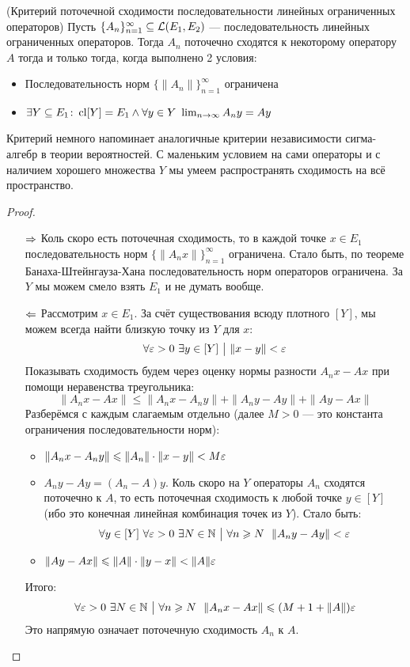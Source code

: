\begin{theorem} (Критерий поточечной сходимости последовательности линейных ограниченных операторов)
	Пусть $\{A_n\}_{n = 1}^\infty \subseteq \mathcal{L}(E_1, E_2)$ --- последовательность линейных ограниченных операторов. Тогда $A_n$ поточечно сходятся к некоторому оператору $A$ тогда и только тогда, когда выполнено 2 условия:
	\begin{itemize}
		\item Последовательность норм $\{\|A_n\|\}_{n = 1}^\infty$ ограничена
		
		\item $\exists Y \subseteq E_1 \colon \operatorname{cl} [Y] = E_1 \wedge \forall y \in Y\ \lim_{n \to \infty} A_ny = Ay$
	\end{itemize}
\end{theorem}

\begin{anote}
	Критерий немного напоминает аналогичные критерии независимости сигма-алгебр в теории вероятностей. С маленьким условием на сами операторы и с наличием хорошего множества $Y$ мы умеем распространять сходимость на всё пространство.
\end{anote}

\begin{proof}~
	\begin{itemize}
		\item[$\Rightarrow$] Коль скоро есть поточечная сходимость, то в каждой точке $x \in E_1$ последовательность норм $\{\|A_nx\|\}_{n = 1}^\infty$ ограничена. Стало быть, по теореме Банаха-Штейнгауза-Хана последовательность норм операторов ограничена. За $Y$ мы можем смело взять $E_1$ и не думать вообще.
		
		\item[$\Leftarrow$] Рассмотрим $x \in E_1$. За счёт существования всюду плотного $[Y]$, мы можем всегда найти близкую точку из $Y$ для $x$:
		\[
			\forall \varepsilon > 0\ \exists y \in [Y] \ \big|\  \|x - y\| < \varepsilon
		\]
		Показывать сходимость будем через оценку нормы разности $A_nx - Ax$ при помощи неравенства треугольника:
		\[
			\|A_nx - Ax\| \le \|A_nx - A_ny\| + \|A_ny - Ay\| + \|Ay - Ax\|
		\]
		Разберёмся с каждым слагаемым отдельно (далее $M > 0$ --- это константа ограничения последовательности норм):
		\begin{itemize}
			\item $\|A_nx - A_ny\| \leqslant \|A_n\| \cdot \|x - y\| < M \varepsilon$
			
			\item $A_ny - Ay = (A_n - A)y$. Коль скоро на $Y$ операторы $A_n$ сходятся поточечно к $A$, то есть поточечная сходимость к любой точке $y \in [Y]$ (ибо это конечная линейная комбинация точек из $Y$). Стало быть:
			\[
				\forall y \in [Y]\ \forall \varepsilon > 0\ \exists N \in \mathbb{N} \ \big|\  \forall n \geqslant N\ \ \|A_ny - Ay\| < \varepsilon
			\]
			
			\item $\|Ay - Ax\| \leqslant \|A\| \cdot \|y - x\| < \|A\|\varepsilon$
		\end{itemize}
		Итого:
		\[
			\forall \varepsilon > 0\ \exists N \in \mathbb{N} \ \big|\  \forall n \geqslant N\ \ \|A_nx - Ax\| \leqslant (M + 1 + \|A\|)\varepsilon
		\]
		Это напрямую означает поточечную сходимость $A_n$ к $A$.
	\end{itemize}
\end{proof}

